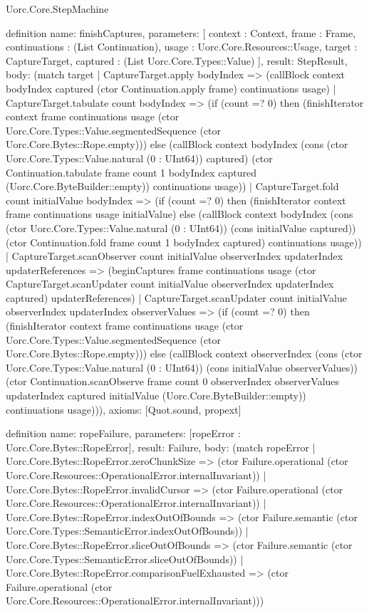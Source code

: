 \begin{lexlean}{Uorc.Core.StepMachine}
\begin{semanticmodule}
definition{
  name: finishCaptures,
  parameters: [
    context : Context,
    frame : Frame,
    continuations : (List Continuation),
    usage : Uorc.Core.Resources::Usage,
    target : CaptureTarget,
    captured : (List Uorc.Core.Types::Value)
  ],
  result: StepResult,
  body: (match target
    | CaptureTarget.apply bodyIndex => (callBlock context bodyIndex captured (ctor Continuation.apply frame) continuations usage)
    | CaptureTarget.tabulate count bodyIndex => (if (count =? 0) then (finishIterator context frame continuations usage (ctor Uorc.Core.Types::Value.segmentedSequence (ctor Uorc.Core.Bytes::Rope.empty))) else (callBlock context bodyIndex (cons (ctor Uorc.Core.Types::Value.natural (0 : UInt64)) captured) (ctor Continuation.tabulate frame count 1 bodyIndex captured (Uorc.Core.ByteBuilder::empty)) continuations usage))
    | CaptureTarget.fold count initialValue bodyIndex => (if (count =? 0) then (finishIterator context frame continuations usage initialValue) else (callBlock context bodyIndex (cons (ctor Uorc.Core.Types::Value.natural (0 : UInt64)) (cons initialValue captured)) (ctor Continuation.fold frame count 1 bodyIndex captured) continuations usage))
    | CaptureTarget.scanObserver count initialValue observerIndex updaterIndex updaterReferences => (beginCaptures frame continuations usage (ctor CaptureTarget.scanUpdater count initialValue observerIndex updaterIndex captured) updaterReferences)
    | CaptureTarget.scanUpdater count initialValue observerIndex updaterIndex observerValues => (if (count =? 0) then (finishIterator context frame continuations usage (ctor Uorc.Core.Types::Value.segmentedSequence (ctor Uorc.Core.Bytes::Rope.empty))) else (callBlock context observerIndex (cons (ctor Uorc.Core.Types::Value.natural (0 : UInt64)) (cons initialValue observerValues)) (ctor Continuation.scanObserve frame count 0 observerIndex observerValues updaterIndex captured initialValue (Uorc.Core.ByteBuilder::empty)) continuations usage))),
  axioms: [Quot.sound, propext]
}

definition{
  name: ropeFailure,
  parameters: [ropeError : Uorc.Core.Bytes::RopeError],
  result: Failure,
  body: (match ropeError
    | Uorc.Core.Bytes::RopeError.zeroChunkSize => (ctor Failure.operational (ctor Uorc.Core.Resources::OperationalError.internalInvariant))
    | Uorc.Core.Bytes::RopeError.invalidCursor => (ctor Failure.operational (ctor Uorc.Core.Resources::OperationalError.internalInvariant))
    | Uorc.Core.Bytes::RopeError.indexOutOfBounds => (ctor Failure.semantic (ctor Uorc.Core.Types::SemanticError.indexOutOfBounds))
    | Uorc.Core.Bytes::RopeError.sliceOutOfBounds => (ctor Failure.semantic (ctor Uorc.Core.Types::SemanticError.sliceOutOfBounds))
    | Uorc.Core.Bytes::RopeError.comparisonFuelExhausted => (ctor Failure.operational (ctor Uorc.Core.Resources::OperationalError.internalInvariant)))
}


\end{semanticmodule}
\end{lexlean}
